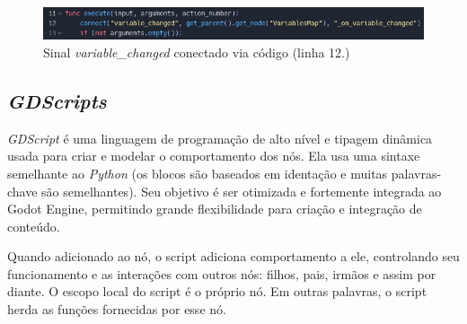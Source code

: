 \begin{figure}[H]
      \includegraphics[width=\textwidth]{../figuras/sinal_conectado_codigo.png}
      \caption{Sinal \textit{variable\_changed} conectado via código (linha 12.)}
\end{figure}

\subsection{\textit{GDScripts}}

\textit{GDScript} é uma linguagem de programação de alto nível e tipagem 
dinâmica usada para criar e modelar o comportamento dos nós.
Ela usa uma sintaxe semelhante ao \textit{Python} (os blocos são 
baseados em identação e muitas palavras-chave são semelhantes). 
Seu objetivo é ser otimizada e fortemente integrada ao Godot Engine, permitindo
grande flexibilidade para criação e integração de conteúdo.

Quando adicionado ao nó, o script adiciona comportamento a ele, controlando seu
funcionamento e as interações com outros nós: filhos, pais, irmãos e assim por 
diante. O escopo local do script é o próprio nó. Em outras palavras, o script 
herda as funções fornecidas por esse nó.